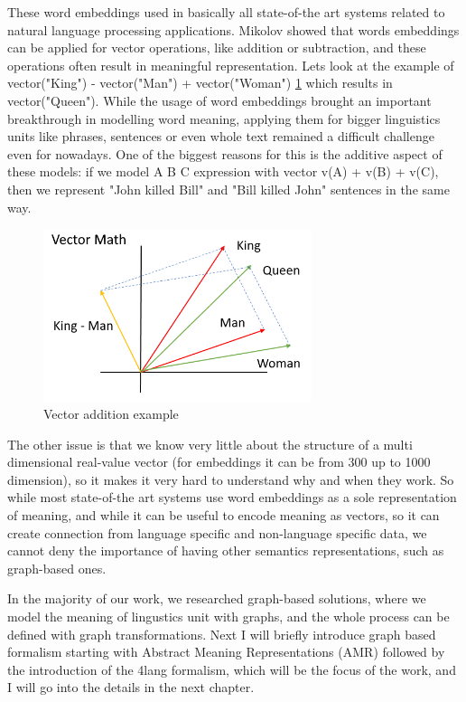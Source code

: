 These word embeddings used in basically all state-of-the art systems related to natural language processing applications. Mikolov \cite{Mikolov:2013c} showed that words embeddings can be applied for vector operations, like addition or subtraction, and these operations often result in meaningful representation. Lets look at the example of vector("King") - vector("Man") + vector("Woman") \ref{fig:vecs} which results in vector("Queen"). While the usage of word embeddings brought an important breakthrough in modelling word meaning, applying them for bigger linguistics units like phrases, sentences or even whole text remained a difficult challenge even for nowadays. One of the biggest reasons for this is the additive aspect of these models: if we model A B C expression with vector v(A) + v(B) + v(C), then we represent "John killed Bill" and "Bill killed John" sentences in the same way. 

\begin{figure}[h!]
	\centering
	\includegraphics[width=0.7\textwidth]{figures/vecs}
	\caption{Vector addition example}
	\label{fig:vecs}
\end{figure}

The other issue is that we know very little about the structure of a multi dimensional real-value vector (for embeddings it can be from 300 up to 1000 dimension), so it makes it very hard to understand why and when they work. So while most state-of-the art systems use word embeddings as a sole representation of meaning, and while it can be useful to encode meaning as vectors, so it can create connection from language specific and non-language specific data, we cannot deny the importance of having other semantics representations, such as graph-based ones. 

In the majority of our work, we researched graph-based solutions, where we model the meaning of lingustics unit with graphs, and the whole process can be defined with graph transformations. Next I will briefly introduce graph based formalism starting with Abstract Meaning Representations (AMR) followed by the introduction of the 4lang formalism, which will be the focus of the work, and I will go into the details in the next chapter.

